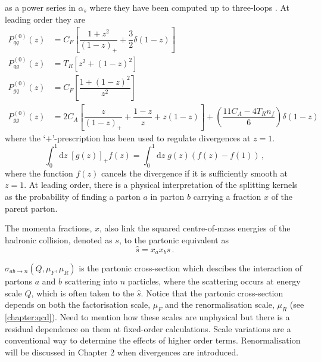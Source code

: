 \documentclass[main.tex]{subfiles}
\begin{document}
    as a power series in $\alpha_{s}$ where they have been computed
    up to three-loops \cite{Moch:2004pa,Vogt:2004mw}.
    At leading order \cite{Altarelli:1977zs} they are
    \begin{align}\label{eqn:AP_kernels}
        P^{(0)}_{qq}(z) &= C_{F}\left[\dfrac{1+z^{2}}{(1-z)_{+}} + \dfrac{3}{2}\delta(1-z)\right] \\
        P^{(0)}_{qg}(z) &= T_{R}\left[z^{2} + (1-z)^{2}\right] \\
        P^{(0)}_{gq}(z) &= C_{F}\left[\dfrac{1+(1-z)^{2}}{z^{2}}\right] \\
        P^{(0)}_{gg}(z) &= 2C_{A}\left[\dfrac{z}{(1-z)_{+}}+\dfrac{1-z}{z}+z(1-z)\right] + \left(\dfrac{11C_{A}-4T_{R}n_{f}}{6}\right)\delta(1-z)
    \end{align}
    where the `$+$'-prescription has been used to regulate divergences
    at $z = 1$.
    \begin{equation}\label{eqn:plus_prescription}
        \int_{0}^{1} \mathrm{d}z \; [g(z)]_{+}f(z) = \int_{0}^{1}\mathrm{d}z \; g(z)(f(z)-f(1)) \, ,
    \end{equation}
    where the function $f(z)$ cancels the divergence if it is
    sufficiently smooth at $z=1$.
    At leading order, there is a physical interpretation
    of the splitting kernels as the probability of finding a parton
    $a$ in parton $b$ carrying a fraction $x$ of the parent parton.
    
    The momenta fractions, $x$, also link the
    squared centre-of-mass energies of the hadronic collision,
    denoted as $s$, to the partonic equivalent as
    \begin{equation}\label{eqn:E_cm_partonic}
        \hat{s} = x_{a}x_{b}s \, .
    \end{equation}

    $\hat{\sigma}_{ab \rightarrow n}(Q, \mu_{F}, \mu_{R})$
    is the partonic cross-section which descibes the interaction of
    partons $a$ and $b$ scattering into $n$ particles,
    where the scattering occurs at energy scale $Q$,
    which is often taken to the $\hat{s}$.
    Notice that the partonic cross-section depends on
    both the factorisation scale, $\mu_{F}$ and
    the renormalisation scale, $\mu_{R}$
    (see \ref{chapter:qcd}).
    {\color{red} Need to mention how these scales
    are unphysical but there is a residual dependence
    on them at fixed-order calculations. Scale
    variations are a conventional way to determine
    the effects of higher order terms.
    Renormalisation will be discussed in Chapter 2
    when divergences are introduced.}
\end{document}
